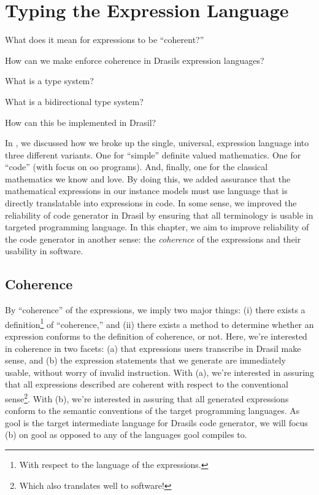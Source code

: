 \chapter{Typing the Expression Language}
\label{chap:typedExpr}

\begin{writingdirectives}
      \item What does it mean for expressions to be ``coherent?''
      \item How can we make enforce coherence in Drasils expression languages?
      \item What is a type system?
      \item What is a bidirectional type system?
      \item How can this be implemented in Drasil?
\end{writingdirectives}

In , we discussed how we broke up the single,
universal, expression language into three different variants. One for ``simple''
definite valued mathematics. One for ``code'' (with focus on \acs{oo} programs).
And, finally, one for the classical mathematics we know and love. By doing this,
we added assurance that the mathematical expressions in our instance models must
use language that is directly translatable into expressions in code. In some
sense, we improved the reliability of code generator in Drasil by ensuring that
all terminology is usable in targeted programming language. In this chapter, we
aim to improve reliability of the code generator in another sense: the
\textit{coherence} of the expressions and their usability in software.

\section{Coherence}
\label{chap:typedExpr:sec:coherence}

By ``coherence'' of the expressions, we imply two major things: (i) there exists
a definition\footnote{With respect to the language of the expressions.} of
``coherence,'' and (ii) there exists a method to determine whether an expression
conforms to the definition of coherence, or not. Here, we're interested in
coherence in two facets: (a) that expressions users transcribe in Drasil make
sense, and (b) the expression statements that we generate are immediately
usable, without worry of invalid instruction. With (a), we're interested in
assuring that all expressions described are coherent with respect to the
conventional sense\footnote{Which also translates well to software!}. With (b),
we're interested in assuring that all generated expressions conform to the
semantic conventions of the target programming languages. As \acs{gool} is the
target intermediate language for Drasils code generator, we will focus (b) on
\acs{gool} as opposed to any of the languages \acs{gool} compiles to.

